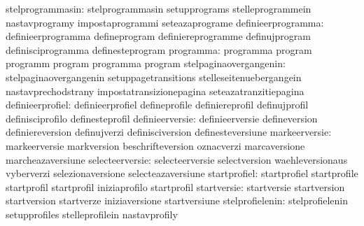                 stelprogrammasin: stelprogrammasin                 setupprograms
                                  stelleprogrammein                nastavprogramy
                                  impostaprogrammi                 seteazaprograme
              definieerprogramma: definieerprogramma               defineprogram
                                  definiereprogramme               definujprogram
                                  definisciprogramma               definesteprogram
                       programma: programma                        program
                                  programm                         program
                                  programma                        program
          stelpaginaovergangenin: stelpaginaovergangenin           setuppagetransitions
                                  stelleseitenuebergangein         nastavprechodstrany
                                  impostatransizionepagina         seteazatranzitiepagina
                definieerprofiel: definieerprofiel                 defineprofile
                                  definiereprofil                  definujprofil
                                  definisciprofilo                 definesteprofil
                 definieerversie: definieerversie                  defineversion
                                  definiereversion                 definujverzi
                                  definisciversion                 definesteversiune
                   markeerversie: markeerversie                    markversion
                                  beschrifteversion                oznacverzi
                                  marcaversione                    marcheazaversiune %
                 selecteerversie: selecteerversie                  selectversion
                                  waehleversionaus                 vyberverzi
                                  selezionaversione                selecteazaversiune %
                    startprofiel: startprofiel                     startprofile
                                  startprofil                      startprofil
                                  iniziaprofilo                    startprofil
                     startversie: startversie                      startversion
                                  startversion                     startverze
                                  iniziaversione                   startversiune
                 stelprofielenin: stelprofielenin                  setupprofiles
                                  stelleprofilein                  nastavprofily
